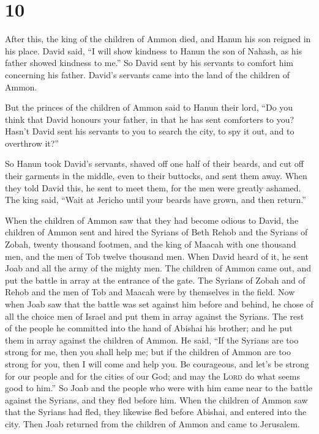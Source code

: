 \hypertarget{section-9}{%
\section{10}\label{section-9}}

 After this, the king of the children of Ammon died, and
Hanun his son reigned in his place.  David said, ``I will
show kindness to Hanun the son of Nahash, as his father showed kindness
to me.'' So David sent by his servants to comfort him concerning his
father. David's servants came into the land of the children of Ammon.

 But the princes of the children of Ammon said to Hanun
their lord, ``Do you think that David honours your father, in that he
has sent comforters to you? Hasn't David sent his servants to you to
search the city, to spy it out, and to overthrow it?''

 So Hanun took David's servants, shaved off one half of
their beards, and cut off their garments in the middle, even to their
buttocks, and sent them away.  When they told David this,
he sent to meet them, for the men were greatly ashamed. The king said,
``Wait at Jericho until your beards have grown, and then return.''

 When the children of Ammon saw that they had become
odious to David, the children of Ammon sent and hired the Syrians of
Beth Rehob and the Syrians of Zobah, twenty thousand footmen, and the
king of Maacah with one thousand men, and the men of Tob twelve thousand
men.  When David heard of it, he sent Joab and all the
army of the mighty men.  The children of Ammon came out,
and put the battle in array at the entrance of the gate. The Syrians of
Zobah and of Rehob and the men of Tob and Maacah were by themselves in
the field.  Now when Joab saw that the battle was set
against him before and behind, he chose of all the choice men of Israel
and put them in array against the Syrians.  The rest of
the people he committed into the hand of Abishai his brother; and he put
them in array against the children of Ammon.  He said,
``If the Syrians are too strong for me, then you shall help me; but if
the children of Ammon are too strong for you, then I will come and help
you.  Be courageous, and let's be strong for our people
and for the cities of our God; and may the \textsc{Lord} do what seems
good to him.''  So Joab and the people who were with him
came near to the battle against the Syrians, and they fled before him.
 When the children of Ammon saw that the Syrians had
fled, they likewise fled before Abishai, and entered into the city. Then
Joab returned from the children of Ammon and came to Jerusalem.

